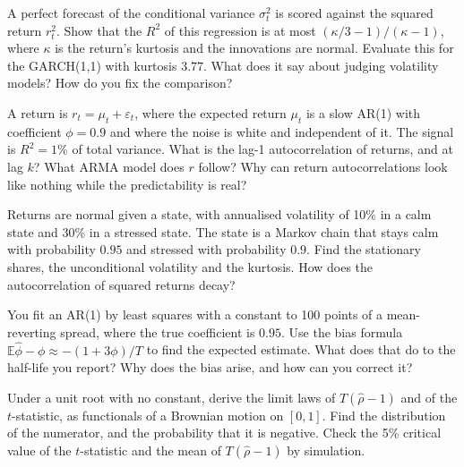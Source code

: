 \begin{question}\label{iq:iv1:time-series:15}
A perfect forecast of the conditional variance $\sigma_t^2$ is scored against the squared return $r_t^2$. Show that the $R^2$ of this regression is at most $(\kappa/3 - 1)/(\kappa - 1)$, where $\kappa$ is the return's kurtosis and the innovations are normal. Evaluate this for the GARCH(1,1) with kurtosis $3.77$. What does it say about judging volatility models? How do you fix the comparison?
\end{question}

\begin{question}\label{iq:iv1:time-series:16}
A return is $r_t = \mu_t + \varepsilon_t$, where the expected return $\mu_t$ is a slow AR(1) with coefficient $\phi = 0.9$ and where the noise is white and independent of it. The signal is $R^2 = 1\%$ of total variance. What is the lag-1 autocorrelation of returns, and at lag $k$? What ARMA model does $r$ follow? Why can return autocorrelations look like nothing while the predictability is real?
\end{question}

\begin{question}\label{iq:iv1:time-series:17}
Returns are normal given a state, with annualised volatility of 10\% in a calm state and 30\% in a stressed state. The state is a Markov chain that stays calm with probability $0.95$ and stressed with probability $0.9$. Find the stationary shares, the unconditional volatility and the kurtosis. How does the autocorrelation of squared returns decay?
\end{question}

\begin{question}\label{iq:iv1:time-series:18}
You fit an AR(1) by least squares with a constant to 100 points of a mean-reverting spread, where the true coefficient is $0.95$. Use the bias formula $\mathbb{E}\hat{\phi} - \phi \approx -(1 + 3\phi)/T$ to find the expected estimate. What does that do to the half-life you report? Why does the bias arise, and how can you correct it?
\end{question}

\begin{question}\label{iq:iv1:time-series:19}
Under a unit root with no constant, derive the limit laws of $T(\hat{\rho} - 1)$ and of the $t$-statistic, as functionals of a Brownian motion on $[0, 1]$. Find the distribution of the numerator, and the probability that it is negative. Check the 5\% critical value of the $t$-statistic and the mean of $T(\hat{\rho} - 1)$ by simulation.
\end{question}

